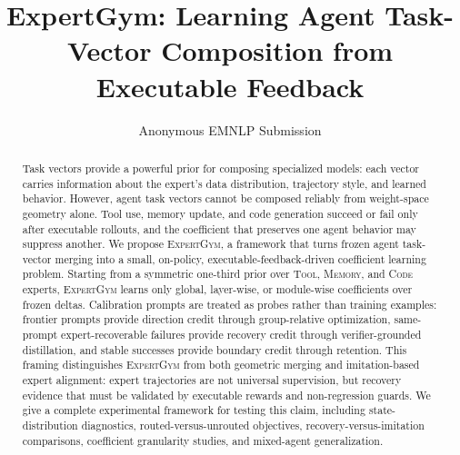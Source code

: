 \documentclass[11pt]{article}
\title{ExpertGym: Learning Agent Task-Vector Composition from Executable Feedback}
\author{Anonymous EMNLP Submission}
\newcommand{\method}{\textsc{ExpertGym}\xspace}
\newcommand{\tool}{\textsc{Tool}\xspace}
\newcommand{\mem}{\textsc{Memory}\xspace}
\newcommand{\code}{\textsc{Code}\xspace}
\begin{document}
\maketitle

\begin{abstract}
Task vectors provide a powerful prior for composing specialized models: each vector carries information about the expert's data distribution, trajectory style, and learned behavior.  However, agent task vectors cannot be composed reliably from weight-space geometry alone.  Tool use, memory update, and code generation succeed or fail only after executable rollouts, and the coefficient that preserves one agent behavior may suppress another.  We propose \method, a framework that turns frozen agent task-vector merging into a small, on-policy, executable-feedback-driven coefficient learning problem.  Starting from a symmetric one-third prior over \tool, \mem, and \code experts, \method learns only global, layer-wise, or module-wise coefficients over frozen deltas.  Calibration prompts are treated as probes rather than training examples: frontier prompts provide direction credit through group-relative optimization, same-prompt expert-recoverable failures provide recovery credit through verifier-grounded distillation, and stable successes provide boundary credit through retention.  This framing distinguishes \method from both geometric merging and imitation-based expert alignment: expert trajectories are not universal supervision, but recovery evidence that must be validated by executable rewards and non-regression guards.  We give a complete experimental framework for testing this claim, including state-distribution diagnostics, routed-versus-unrouted objectives, recovery-versus-imitation comparisons, coefficient granularity studies, and mixed-agent generalization.
\end{abstract}
\end{document}
